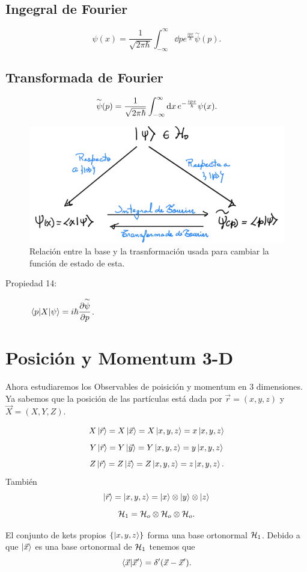 \subsection{Ingegral de Fourier}
    $$ \psi (x) = \frac{1}{\sqrt{2\pi \hbar}} \int _{-\infty} ^\infty \dd{p} e^{\frac{ipx}{\hbar}} \overset{\sim}{\psi} (p). $$

\subsection{Transformada de Fourier}
    $$ \overset{\sim}{\psi} (p) = \frac{1}{\sqrt{2\pi \hbar}} \int _{-\infty} ^\infty \dd{x} e^{-\frac{ipx}{\hbar}} \psi (x). $$

\begin{figure}[H]
    \centering
    \includegraphics[scale=0.5]{img/transformadaFourier.png}
    \caption{Relación entre la base y la trasnformación usada para cambiar la función de estado de esta.}
    \label{fig:fourier}
\end{figure}

\begin{description}
    \item[Propiedad 14: ] $\mel{p}{X}{\psi} = i\hbar \displaystyle\pdv{\overset{\sim}{\psi}}{p}$. 
\end{description}



\section{Posición y Momentum 3-D}
Ahora estudiaremos los Observables de poisición y momentum en 3 dimensiones. Ya sabemos que la posición de las partículas está dada por $\vec{r} = (x,y,z)$ y $\vec{X} = (X,Y,Z)$.
\begin{tcolorbox}
        $$ X \ket{\vec{r}} = X \ket{\vec{x}} = X\ket{x,y,z} = x\ket{x,y,z} $$
        $$ Y \ket{\vec{r}} = Y \ket{\vec{y}} = Y\ket{x,y,z} = y\ket{x,y,z} $$
        $$ Z \ket{\vec{r}} = Z \ket{\vec{z}} = Z\ket{x,y,z} = z\ket{x,y,z}. $$
    También
        $$ \ket{\vec{r}} = \ket{x,y,z} = \ket{x} \otimes \ket{y} \otimes \ket{z} $$
        $$ \mathcal{H} _1 = \mathcal{H} _o \otimes \mathcal{H} _o \otimes \mathcal{H} _o. $$
\end{tcolorbox}
El conjunto de kets propios $\{ \ket{x,y,z} \}$ forma una base ortonormal $\mathcal{H} _1$. Debido a que $\ket{\vec{x}}$ es una base ortonormal de $\mathcal{H} _1$ tenemos que
    $$ \braket{\vec{x}}{\vec{x}'} = \delta ' (\vec{x} - \vec{x}'). $$
   

